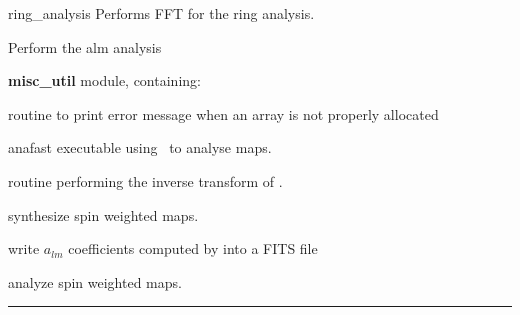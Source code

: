 \begin{modules}
  \begin{sulist}{} %
  \item[ring\_analysis] Performs FFT for the ring analysis.
  \item[\htmlref{map2alm}{sub:map2alm}] Perform the alm analysis
  \item[\textbf{misc\_util}] module, containing:
  \item[\htmlref{assert\_alloc}{sub:assert}] routine to print error message when an array is not
  properly allocated		
  \end{sulist}
\end{modules}

\begin{related}
  \begin{sulist}{} %
  \item[anafast] executable using \thedocid \ to analyse maps.
  \item[\htmlref{alm2map}{sub:alm2map}] routine performing the inverse transform of \thedocid.
  \item[\htmlref{alm2map\_spin}{sub:alm2map_spin}] synthesize spin weighted
maps.
  \item[\htmlref{dump\_alms}{sub:dump_alms}] write $a_{lm}$ coefficients
computed by \thedocid into a FITS file
  \item[\htmlref{map2alm\_spin}{sub:map2alm_spin}] analyze spin weighted maps.
  \end{sulist}
\end{related}

\rule{\hsize}{2mm}

\newpage
